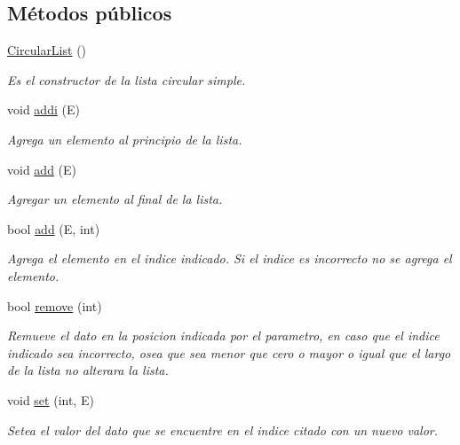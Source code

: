 \subsection*{Métodos públicos}
\begin{DoxyCompactItemize}
\item 
\hypertarget{classCircularList_aad23571a808ede6fc0432dca645ab2ca}{\hyperlink{classCircularList_aad23571a808ede6fc0432dca645ab2ca}{Circular\-List} ()}\label{classCircularList_aad23571a808ede6fc0432dca645ab2ca}

\begin{DoxyCompactList}\small\item\em Es el constructor de la lista circular simple. \end{DoxyCompactList}\item 
void \hyperlink{classCircularList_a275c75e142e791de9a1a00691af56a73}{addi} (E)
\begin{DoxyCompactList}\small\item\em Agrega un elemento al principio de la lista. \end{DoxyCompactList}\item 
void \hyperlink{classCircularList_a892b493309f36fb083fdd257388cfa36}{add} (E)
\begin{DoxyCompactList}\small\item\em Agregar un elemento al final de la lista. \end{DoxyCompactList}\item 
bool \hyperlink{classCircularList_af184d3ac2e3bba683a44a6cc19392b12}{add} (E, int)
\begin{DoxyCompactList}\small\item\em Agrega el elemento en el indice indicado. Si el indice es incorrecto no se agrega el elemento. \end{DoxyCompactList}\item 
bool \hyperlink{classCircularList_a4a6acfd818a0ae9055957ec80258c60a}{remove} (int)
\begin{DoxyCompactList}\small\item\em Remueve el dato en la posicion indicada por el parametro, en caso que el indice indicado sea incorrecto, osea que sea menor que cero o mayor o igual que el largo de la lista no alterara la lista. \end{DoxyCompactList}\item 
void \hyperlink{classCircularList_aa54489e11ad76bf929f92b1dce97a3a3}{set} (int, E)
\begin{DoxyCompactList}\small\item\em Setea el valor del dato que se encuentre en el indice citado con un nuevo valor. \end{DoxyCompactList}\item 

\end{DoxyCompactItemize}
